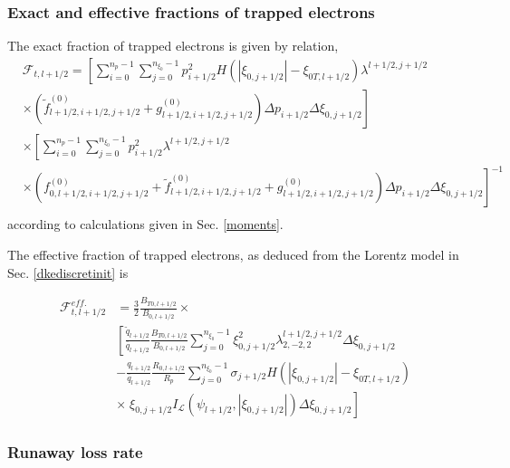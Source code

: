 \subsubsection{Exact and effective fractions of trapped electrons}

The exact fraction of trapped electrons is given by relation,
\begin{align}
&\mathcal{F}_{t,l+1/2}=\left[\sum_{i=0}^{n_{p}-1}\sum_{j=0}^{n_{\xi_{0}}%
-1}p_{i+1/2}^{2}H\left(  \left|  \xi_{0,j+1/2}\right|  -\xi_{0T,l+1/2}\right)
\lambda^{l+1/2,j+1/2}\right.\nonumber\\&\times\left.\left(  \widetilde{f}_{l+1/2,i+1/2,j+1/2}^{(0)}%
+g_{l+1/2,i+1/2,j+1/2}^{(0)}\right)  \Delta
p_{i+1/2}\Delta\xi_{0,j+1/2}\right]\nonumber\\&\times\left[
\sum_{i=0}^{n_{p}-1}\sum_{j=0}^{n_{\xi_{0}}-1}p_{i+1/2}^{2}\lambda
^{l+1/2,j+1/2}\right.\nonumber\\&\times\left.\left(  f_{0,l+1/2,i+1/2,j+1/2}^{(0)}+\widetilde{f}%
_{l+1/2,i+1/2,j+1/2}^{(0)}+g_{l+1/2,i+1/2,j+1/2}^{(0)}\right)
\Delta p_{i+1/2}\Delta\xi_{0,j+1/2}\right]^{-1}\nonumber\\%
\end{align}
according to calculations given in Sec. \ref{moments}.

The effective fraction of trapped electrons, as deduced from the Lorentz model
in Sec. \ref{dkediscretinit} is%

\begin{align}
\mathcal{F}_{t,l+1/2}^{eff.}  &  =\frac{3}{2}\frac{B_{T0,l+1/2}}{B_{0,l+1/2}%
}\times\nonumber\\
&  \left[  \frac{\widetilde{q}_{l+1/2}}{\overline{q}_{l+1/2}}\frac
{B_{T0,l+1/2}}{B_{0,l+1/2}}\sum_{j=0}^{n_{\xi_{0}}-1}\xi_{0,j+1/2}^{2}%
\lambda_{2,-2,2}^{l+1/2,j+1/2}\Delta\xi_{0,j+1/2}\right. \nonumber\\
&  \left.  -\frac{q_{l+1/2}}{\overline{q}_{l+1/2}}\frac{R_{0,l+1/2}}{R_{p}%
}\sum_{j=0}^{n_{\xi_{0}}-1}\sigma_{j+1/2}H\left(  \left|  \xi_{0,j+1/2}%
\right|  -\xi_{0T,l+1/2}\right) \right.\nonumber\\&\times\left.
\;\xi_{0,j+1/2}I_{\mathcal{L}}\left(
\psi_{l+1/2},\left|  \xi_{0,j+1/2}\right|  \right)  \Delta\xi_{0,j+1/2}%
\right]
\end{align}

\subsubsection{Runaway loss rate}

